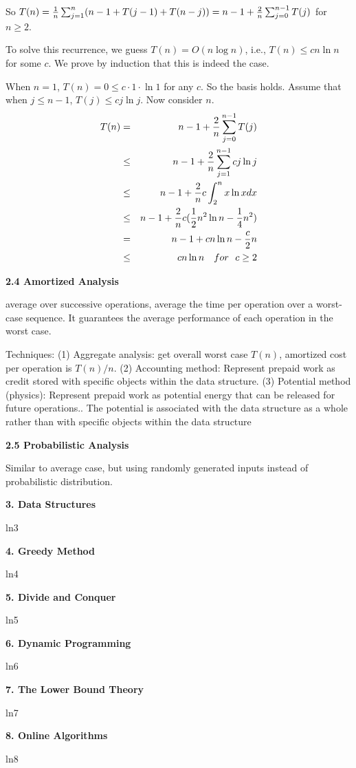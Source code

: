 \documentclass[8pt]{minimal}
\begin{document}
\begin{flushleft}
\begin{multicols}{3}
So $T(n)={1\over n}\sum_{j=1}^n(n-1+T(j-1)+T(n-j))=n-1+{2\over n}
\sum_{j=0}^{n-1}T(j)$ for $n\ge2$.

To solve this recurrence, we guess $T(n)=O(n\log n)$, i.e., 
$T(n)\le cn\ln n$ for some $c$. We prove by induction that
this is indeed the case.

When $n=1$, $T(n)=0\le c\cdot 1\cdot \ln 1$ for any $c$. So the
basis holds. Assume that when $j\le n-1$, $T(j)\le cj\ln j$.
Now consider $n$.
\begin{eqnarray*}
T(n)&=&n-1+{2\over n}\sum_{j=0}^{n-1}T(j)\\
&\le&n-1+{2\over n}\sum_{j=1}^{n-1}cj\ln j\\
&\le&n-1+{2\over n}c\int_2^n x\ln xdx\\
&\le&n-1+{2\over n}c({1\over2}n^2\ln n-{1\over4}n^2)\\
&=&n-1+cn\ln n-{c\over2}n\\
&\le&cn\ln n { \quad for\ \ } c\ge  2
\end{eqnarray*}


    \textbf{2.4 Amortized Analysis}

average over successive operations,
average the time per operation over a worst-case sequence.
It guarantees the average performance of each operation in the worst case.

Techniques:
(1) Aggregate analysis: get overall worst case $T(n)$, amortized cost per operation is $T(n) / n$.
(2) Accounting method: Represent prepaid work as credit stored with speciﬁc objects within the data
structure.
(3) Potential method (physics): Represent prepaid work as potential energy that can be released for future operations..
The potential is associated with the data structure as a whole rather than with speciﬁc objects within the data
structure

    \textbf{2.5 Probabilistic Analysis}

Similar to average case, but using randomly generated inputs instead of probabilistic distribution.


    \textbf{3. Data Structures}

    ln3


    \textbf{4. Greedy Method}

    ln4


    \textbf{5. Divide and Conquer}

    ln5


    \textbf{6. Dynamic Programming}

    ln6


    \textbf{7. The Lower Bound Theory}

    ln7


    \textbf{8. Online Algorithms}

    ln8
    

    \lipsum
    \lipsum

\end{multicols}
\end{flushleft}
\end{document}
